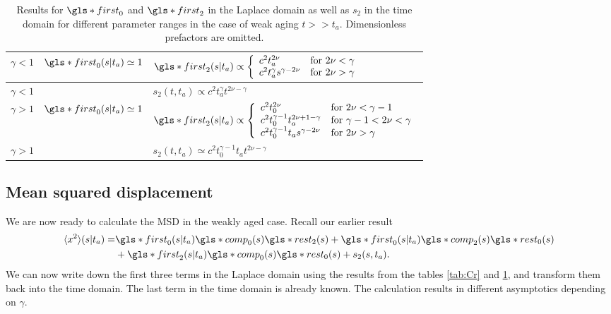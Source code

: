 \begin{center}
\begin{table}[h!]
 \begin{tabular}{||l|l|l||}
 \hline \hline
\rule[-4mm]{0cm}{1cm}   $\gamma<1$ & $\gls*{first}_0(s|t_a) \simeq 1$ & $\gls*{first}_2(s|t_a) \propto \left\{
\begin{array}{ll}
c^2 t_a^{2\nu}  & \mbox{for } 2\nu < \gamma \\
c^2 t_a^\gamma s^{\gamma-2\nu} & \mbox{for } 2\nu > \gamma
\end{array} \right. $\\ \hline
\rule[-4mm]{0cm}{1cm} $\gamma<1$ & $  $ & $s_2(t,t_a) \propto c^2 t_a^\gamma t^{2\nu -\gamma} $ \\ \hline
\rule[-4mm]{0cm}{1cm} $\gamma>1$ & $\gls*{first}_0(s|t_a) \simeq 1$ & $\gls*{first}_2(s|t_a) \propto \left\{
 \begin{array}{ll}
c^2  t_0^{2\nu} & \mbox{for } 2\nu < \gamma  -1     \\
  c^2  t_0^{\gamma-1} t_a^{2\nu +1- \gamma } & \mbox{for } \gamma-1 < 2\nu < \gamma \\
 c^2 t_0^{\gamma-1} t_a s^{\gamma - 2\nu} & \mbox{for } 2\nu > \gamma
 \end{array}
 \right. $ \\ \hline
\rule[-4mm]{0cm}{1cm} $\gamma>1$& & $s_2(t,t_a) \simeq c^2 t_0^{\gamma-1}  t_a t^{2\nu-\gamma}$ \\ \hline \hline
\end{tabular}
\caption{Results for $\gls*{first}_0$ and $\gls*{first}_2$ in the Laplace domain as well as $s_2$ in the time domain for different parameter ranges in the case of weak aging $t>>t_a$. Dimensionless prefactors are omitted.
\label{tab:sFweakAging}}
\end{table}
\end{center}



\subsection*{Mean squared displacement}

We are now ready to calculate the MSD in the weakly aged case. Recall our earlier result
\begin{align}
\langle x^2 \rangle (s|t_a) =&  \gls*{first}_0(s|t_a) \gls*{comp}_0(s) \gls*{rest}_2(s) + \gls*{first}_0(s|t_a) \gls*{comp}_2(s) \gls*{rest}_0(s)  \nonumber \\
& + \gls*{first}_2(s|t_a) \gls*{comp}_0(s) \gls*{rest}_0(s) + s_{2}(s,t_a) .
\end{align}
We can now write down the first three terms in the Laplace domain using the results from the tables \ref{tab:Cr} and \ref{tab:sFweakAging}, and transform them back into the time domain.
The last term in the time domain is already known. The calculation results in different asymptotics depending on $\gamma$.

